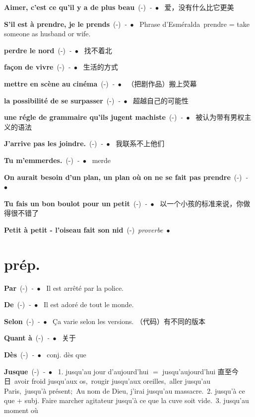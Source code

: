 \documentclass[10pt,a4paper,twoside]{article} %
\newcommand{\entry}[4]{\textbf{#1}\ {(#2)}\ \textit{#3}\ $\bullet$\ {#4}} %
\begin{document}
\begin{CJK*}{UTF8}{gkai}
\begin{multicols}{2}
\entry{Aimer, c'est ce qu'il y a de plus beau}{-}{-}
{
爱，没有什么比它更美
}

\entry{S'il est à prendre, je le prends}{-}{-}
{
Phrase d'Esméralda\ 
prendre = take someone as husband or wife.
}

\entry{perdre le nord}{-}{-}
{
找不着北
}

\entry{façon de vivre}{-}{-}
{
生活的方式
}

\entry{mettre en scène au cinéma}{-}{-}
{
（把剧作品）搬上荧幕
}

\entry{la possibilité de se surpasser}{-}{-}
{
超越自己的可能性
}

\entry{une régle de grammaire qu'ils jugent machiste}{-}{-}
{
被认为带有男权主义的语法
}

\entry{J'arrive pas les joindre.}{-}{-}
{
我联系不上他们
}

\entry{Tu m'emmerdes.}{-}{-}
{
merde
}

\entry{On aurait besoin d'un plan, un plan o\`u on ne se fait pas prendre}{-}{-}
{
}

\entry{Tu fais un bon boulot pour un petit}{-}{-}
{
以一个小孩的标准来说，你做得很不错了
}

\entry{Petit à petit - l'oiseau fait son nid}{-}{proverbe}
{
}

\end{multicols}


\section*{prép.}

\begin{multicols}{2}

\entry{Par}{-}{-}
{
Il est arrêté par la police.
}

\entry{De}{-}{-}
{
Il est adoré de tout le monde.
}

\entry{Selon}{-}{-}
{
Ça varie selon les versions. （代码）有不同的版本
}

\entry{Quant à}{-}{-}
{
关于
}

\entry{Dès}{-}{-}
{
conj. dès que 
}

\entry{Jusque}{-}{-}
{
1. jusqu'au jour d'aujourd'hui $=$ jusqu'aujourd'hui 直至今日\ 
avoir froid jusqu'aux os,\ rougir jusqu'aux oreilles,\ aller jusqu'au Paris,\ jusqu'à présent;\
Au nom de Dieu, j'irai jusqu'au massacre.\ 
2. jusqu'à ce que + subj. Faire marcher agitateur jusqu'à ce que la cuve soit vide.\ 
3. jusqu'au moment o\`u
}

\end{multicols}

\end{CJK*}
\end{document}
